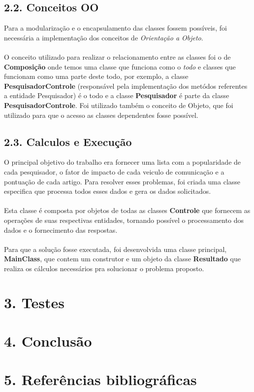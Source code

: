 \documentclass[12pt, a4paper]{article}
\begin{document}
  \subsection*{2.2. Conceitos OO}
    Para a modularização e o encapsulamento das classes fossem possíveis, foi necessária a implementação dos conceitos de \textit{Orientação a Objeto}.\\\\
    O conceito utilizado para realizar o relacionamento entre as classes foi o de \textbf{Composição} onde temos uma classe que funciona como o \textit{todo} e classes que funcionam como uma parte deste todo, por exemplo, a classe \textbf{PesquisadorControle} (responsável pela implementação dos metódos referentes a entidade Pesquisador) é o todo e a classe \textbf{Pesquisador} é parte da classe \textbf{PesquisadorControle}.
    Foi utilizado também o conceito de Objeto, que foi utilizado para que o acesso as classes dependentes fosse possível.

  \subsection*{2.3. Calculos e Execução}
    O principal objetivo do trabalho era fornecer uma lista com a popularidade de cada pesquisador, o fator de impacto de cada veiculo de comunicação e a pontuação de cada artigo. Para resolver esses problemas, foi criada uma classe especifica que processa todos esses dados e gera os dados solicitados.\\\\
    Esta classe é composta por objetos de todas as classes \textbf{Controle} que fornecem as operações de suas respectivas entidades, tornando possível o processamento dos dados e o fornecimento das respostas.\\\\
    Para que a solução fosse executada, foi desenvolvida uma classe principal, \textbf{MainClass}, que contem um construtor e um objeto da classe \textbf{Resultado} que realiza os cálculos necessários pra solucionar o problema proposto.


\section*{3. Testes}

\section*{4. Conclusão}


\section*{5. Referências bibliográficas}
\end{document}
